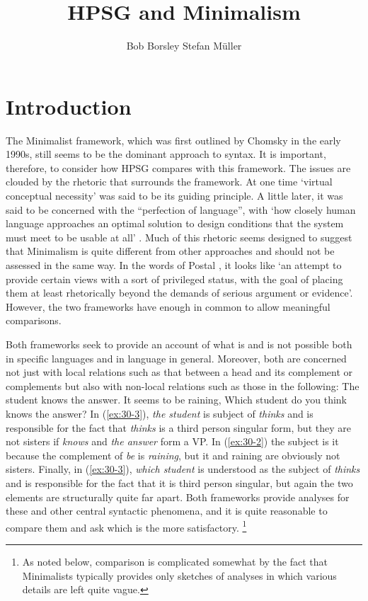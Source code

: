 \documentclass[output=paper]{langsci/langscibook}
\author{%
	Bob Borsley\affiliation{University of Essex}%
	\lastand Stefan Müller\affiliation{Humboldt-Universität zu Berlin}%
}
\title{HPSG and Minimalism}
\begin{document}
\section{Introduction}
\label{sec:30-1}

The Minimalist framework, which was first outlined by Chomsky in the early 1990s, still seems to be the dominant approach to syntax. It is important, therefore, to consider how HPSG compares with this framework. The issues are clouded by the rhetoric that surrounds the framework. At one time ‘virtual conceptual necessity’ was said to be its guiding principle. A little later, it was said to be concerned with the ``perfection of language'', with `how closely human language approaches an optimal solution to design conditions that the system must meet to be usable at all' \citet[58]{Chomsky2002a-u}. Much of this rhetoric seems designed to suggest that Minimalism is quite different from other approaches and should not be assessed in the same way. In the words of Postal \citet[19]{Postal2003a}, it looks like `an attempt to provide certain views with a sort of privileged status, with the goal of placing them at least rhetorically beyond the demands of serious argument or evidence'. However, the two frameworks have enough in common to allow meaningful comparisons.

Both frameworks seek to provide an account of what is and is not possible both in specific languages and in language in general. Moreover, both are concerned not just with local relations such as that between a head and its complement or complements but also with non-local relations such as those in the following:
\ea\label{ex:30-1}
The student knows the answer.
\z
\ea\label{ex:30-2}
It seems to be raining,
\z
\ea\label{ex:30-3}
Which student do you think knows the answer? 
\z
In (\ref{ex:30-3}), \textit{the student} is subject of \textit{thinks} and is responsible for the fact that \textit{thinks} is a third person singular form, but they are not sisters if \textit{knows} and \textit{the answer} form a VP. In (\ref{ex:30-2}) the subject is it because the complement of \textit{be} is \textit{raining}, but it and raining are obviously not sisters. Finally, in (\ref{ex:30-3}), \textit{which student} is understood as the subject of \textit{thinks} and is responsible for the fact that it is third person singular, but again the two elements are structurally quite far apart. Both frameworks provide analyses for these and other central syntactic phenomena, and it is quite reasonable to compare them and ask which is the more satisfactory.%
	\footnote{As noted below, comparison is complicated somewhat by the fact that Minimalists typically provides only sketches of analyses in which various details are left quite vague.}%
\end{document}
